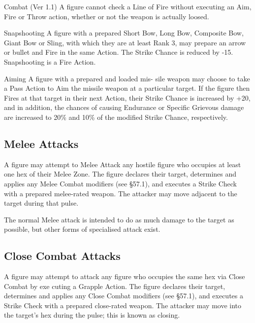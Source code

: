 \begin{Chapter}{Combat (Ver 1.1)}
A figure cannot check a Line of Fire without executing an Aim, Fire or
Throw action, whether or not the weapon is actually loosed.

\begin{Description}

\item[Snapshooting] A figure with a prepared Short Bow, Long Bow,
  Composite Bow, Giant Bow or Sling, with which they are at least Rank
  3, may prepare an arrow or bullet and Fire in the same Action. The
  Strike Chance is reduced by -15. Snapshooting is a Fire Action.

\item[Aiming] A figure with a prepared and loaded mis- sile weapon may
  choose to take a Pass Action to Aim the missile weapon at a
  particular target. If the figure then Fires at that target in their
  next Action, their Strike Chance is increased by +20, and in
  addition, the chances of causing Endurance or Specific Grievous
  damage are increased to 20\% and 10\% of the modified Strike Chance,
  respectively.

\end{Description}

\subsection{Melee Attacks}

A figure may attempt to Melee Attack any hostile figure who occupies
at least one hex of their Melee Zone.  The figure declares their
target, determines and applies any Melee Combat modifiers (see §57.1),
and executes a Strike Check with a prepared melee-rated weapon. The
attacker may move adjacent to the target during that pulse.

The normal Melee attack is intended to do as much damage to the target
as possible, but other forms of specialised attack exist.

\subsection{Close Combat Attacks}

A figure may attempt to attack any figure who occupies the same hex
via Close Combat by exe cuting a Grapple Action.  The figure declares
their target, determines and applies any Close Combat modifiers (see
§57.1), and executes a Strike Check with a prepared close-rated
weapon.  The attacker may move into the target’s hex during the pulse;
this is known as closing.


\end{Chapter}
